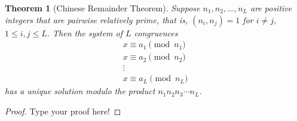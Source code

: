 \documentclass[12pt,leqno]{article}
\numberwithin{equation}{section}
\newtheorem{thm}{Theorem}[section]
\theoremstyle{definition}
\begin{document}
\begin{thm}[Chinese Remainder Theorem]
Suppose $n_1, n_2, \hdots, n_L$ are positive integers that are
pairwise relatively prime, that is, $(n_i, n_j)=1$ for $i\neq j$,
$1\leq i, j \leq L$.  Then the system of $L$ congruences
\[ \begin{array}{c}
x \equiv a_1 \pmod{n_1} \\
x \equiv a_2 \pmod{n_2} \\
\vdots \\
x \equiv a_L \pmod{n_L} \end{array} \] has a unique solution modulo
the product $n_1 n_2  n_3 \cdots n_L$.
\end{thm}

\begin{proof}[Proof]
Type your proof here!
\end{proof}
\end{document}
